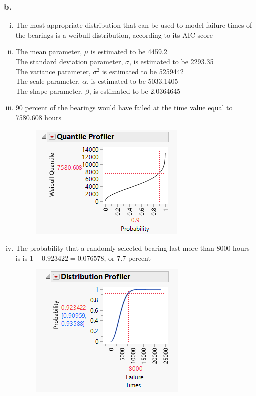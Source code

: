 \documentclass[14pt]{article}
\begin{document}
\subsubsection*{b.}
\begin{enumerate}[(i)]

\item
The most appropriate distribution that can be used to model failure times of the bearings is a weibull distribution, according to its AIC score

\item
The mean parameter, $\mu$ is estimated to be 4459.2 \\
The standard deviation parameter, $\sigma$, is estimated to be 2293.35 \\
The variance parameter, $\sigma^2$ is estimated to be 5259442 \\
The scale parameter, $\alpha$, is estimated to be 5033.1405 \\
The shape parameter, $\beta$, is estimated to be 2.0364645

\item
90 percent of the bearings would have failed at the time value equal to 7580.608 hours

\begin{figure}[h]
\centering
\includegraphics{exam2/1biii.png}
\end{figure}

\item
The probability that a randomly selected bearing last more than 8000 hours is is $1 - 0.923422 = 0.076578$, or 7.7 percent 

\begin{figure}[h]
\centering
\includegraphics{exam2/1biv.png}
\end{figure}

\end{enumerate}
\end{document}
